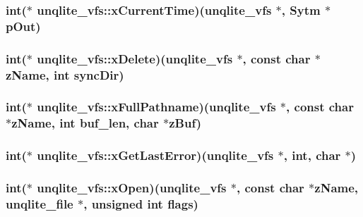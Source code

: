 \hypertarget{structunqlite__vfs_a2fd9fc0c455d92227d516f013bdd65a3}{
\subsubsection[{x\-Current\-Time}]{\setlength{\rightskip}{0pt plus 5cm}int($\ast$ unqlite\-\_\-vfs\-::x\-Current\-Time)({\bf unqlite\-\_\-vfs} $\ast$, {\bf Sytm} $\ast$p\-Out)}}\label{d5/d07/structunqlite__vfs_a2fd9fc0c455d92227d516f013bdd65a3}
\hypertarget{structunqlite__vfs_ad961a2b6210572b31877922d4b18eb99}{
\subsubsection[{x\-Delete}]{\setlength{\rightskip}{0pt plus 5cm}int($\ast$ unqlite\-\_\-vfs\-::x\-Delete)({\bf unqlite\-\_\-vfs} $\ast$, const char $\ast${\bf z\-Name}, int sync\-Dir)}}\label{d5/d07/structunqlite__vfs_ad961a2b6210572b31877922d4b18eb99}
\hypertarget{structunqlite__vfs_ad18e48a2b14c153ff1e06a3194c963b7}{
\subsubsection[{x\-Full\-Pathname}]{\setlength{\rightskip}{0pt plus 5cm}int($\ast$ unqlite\-\_\-vfs\-::x\-Full\-Pathname)({\bf unqlite\-\_\-vfs} $\ast$, const char $\ast${\bf z\-Name}, int buf\-\_\-len, char $\ast$z\-Buf)}}\label{d5/d07/structunqlite__vfs_ad18e48a2b14c153ff1e06a3194c963b7}
\hypertarget{structunqlite__vfs_a1a54114bc39a46dbbc91a55fb2e551f9}{
\subsubsection[{x\-Get\-Last\-Error}]{\setlength{\rightskip}{0pt plus 5cm}int($\ast$ unqlite\-\_\-vfs\-::x\-Get\-Last\-Error)({\bf unqlite\-\_\-vfs} $\ast$, int, char $\ast$)}}\label{d5/d07/structunqlite__vfs_a1a54114bc39a46dbbc91a55fb2e551f9}
\hypertarget{structunqlite__vfs_a89535ece5182f32a6281d5895cce61a9}{
\subsubsection[{x\-Open}]{\setlength{\rightskip}{0pt plus 5cm}int($\ast$ unqlite\-\_\-vfs\-::x\-Open)({\bf unqlite\-\_\-vfs} $\ast$, const char $\ast${\bf z\-Name}, {\bf unqlite\-\_\-file} $\ast$, unsigned int flags)}}\label{d5/d07/structunqlite__vfs_a89535ece5182f32a6281d5895cce61a9}
